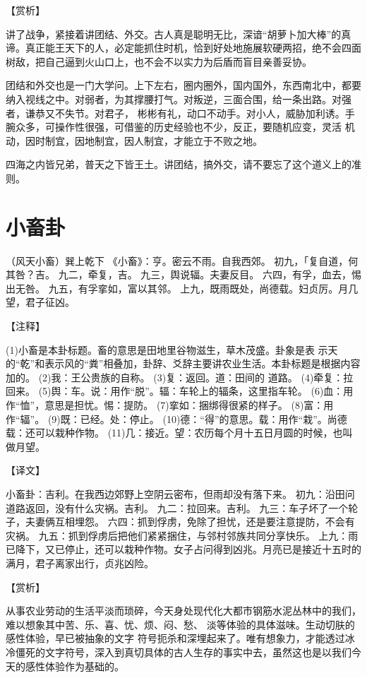 \documentclass[12pt,UTF8]{ctexbook}
\begin{document}
【赏析】

讲了战争，紧接着讲团结、外交。古人真是聪明无比，深谙“胡萝卜加大棒”的真谛。真正能王天下的人，必定能抓住时机，恰到好处地施展软硬两招，绝不会四面树敌，把自己逼到火山口上，也不会不以实力为后盾而盲目亲善妥协。

团结和外交也是一门大学问。上下左右，圈内圈外，国内国外，东西南北中，都要纳入视线之中。对弱者，为其撑腰打气。对叛逆，三面合围，给一条出路。对强者，谦恭又不失节。对君子， 彬彬有礼，动口不动手。对小人，威胁加利诱。手腕众多，可操作性很强，可借鉴的历史经验也不少，反正，要随机应变，灵活 机动，因时制宜，因地制宜，因人制宜，才能立于不败之地。

四海之内皆兄弟，普天之下皆王土。讲团结，搞外交，请不要忘了这个道义上的准则。

\chapter{小畜卦}

（风天小畜）巽上乾下
《小畜》：亨。密云不雨。自我西郊。
初九，「复自道，何其咎？吉。
九二，牵复，吉。
九三，舆说辐。夫妻反目。
六四，有孚，血去，惕出无咎。
九五，有孚挛如，富以其邻。
上九，既雨既处，尚德载。妇贞厉。月几望，君子征凶。

【注释】

(1)小畜是本卦标题。畜的意思是田地里谷物滋生，草木茂盛。卦象是表 示天的“乾”和表示风的“粪”相叠加，卦辞、爻辞主要讲农业生活。本卦标题是根据内容加的。
(2)我：王公贵族的自称。
(3)复：返回。道：田间的 道路。
(4)牵复：拉回来。
(5)舆：车。说：用作“脱”。辐：车轮上的辐条，这里指车轮。
(6)血：用作“恤”，意思是担忧。惕：提防。
(7)挛如：捆绑得很紧的样子。
(8)富：用作“辐”。
(9)既：已经。处：停止。
(10)德：“得”的意思。载：用作“栽”。尚德载：还可以栽种作物。
(11)几：接近。望：农历每个月十五日月圆的时候，也叫做月望。

【译文】

小畜卦：吉利。在我西边郊野上空阴云密布，但雨却没有落下来。
初九：沿田问道路返回，没有什么灾祸。吉利。
九二：拉回来。吉利。
九三：车子坏了一个轮子，夫妻俩互相埋怨。
六四：抓到俘虏，免除了担忧，还是要注意提防，不会有灾祸。
九五：抓到俘虏后把他们紧紧捆住，与邻村邻族共同分享快乐。
上九：雨已降下，又已停止，还可以栽种作物。女子占问得到凶兆。月亮已是接近十五时的满月，君子离家出行，贞兆凶险。

【赏析】

从事农业劳动的生活平淡而琐碎，今天身处现代化大都市钢筋水泥丛林中的我们，难以想象其中苦、乐、喜、忧、烦、闷、愁、 淡等体验的具体滋味。生动切肤的感性体验，早已被抽象的文字 符号扼杀和深埋起来了。唯有想象力，才能透过冰冷僵死的文字符号，深入到真切具体的古人生存的事实中去，虽然这也是以我们今天的感性体验作为基础的。
\end{document}
